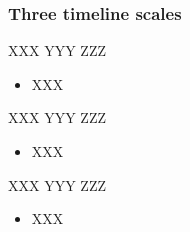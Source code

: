 \begin{frame}
\frametitle{Three timeline scales}

XXX YYY ZZZ
\begin{itemize}
\item XXX
\end{itemize}
\vskip 0.15in

XXX YYY ZZZ
\begin{itemize}
\item XXX
\end{itemize}
\vskip 0.15in

XXX YYY ZZZ
\begin{itemize}
\item XXX
\end{itemize}
\vskip 0.15in

\end{frame}



